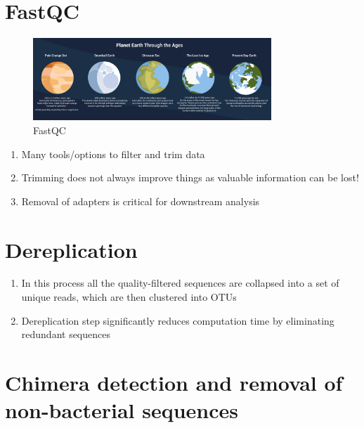 \documentclass[
]{book}
\providecommand{\tightlist}{%
  \setlength{\itemsep}{0pt}\setlength{\parskip}{0pt}}
\begin{document}
\hypertarget{fastqc}{%
\section{FastQC}\label{fastqc}}

\begin{figure}
\centering
\includegraphics[width=0.8\textwidth,height=\textheight]{./Figures/Planets.png}
\caption{FastQC}
\end{figure}

\begin{enumerate}
\def\labelenumi{\arabic{enumi}.}
\tightlist
\item
  Many tools/options to filter and trim data
\item
  Trimming does not always improve things as valuable information
  can be lost!
\item
  Removal of adapters is critical for downstream analysis
\end{enumerate}

\hypertarget{dereplication}{%
\section{Dereplication}\label{dereplication}}

\begin{enumerate}
\def\labelenumi{\arabic{enumi}.}
\tightlist
\item
  In this process all the quality-filtered sequences are collapsed into a set of unique reads, which are then clustered into OTUs
\item
  Dereplication step significantly reduces computation time by eliminating redundant sequences
\end{enumerate}

\hypertarget{chimera-detection-and-removal-of-non-bacterial-sequences}{%
\section{Chimera detection and removal of non-bacterial sequences}\label{chimera-detection-and-removal-of-non-bacterial-sequences}}
\end{document}
